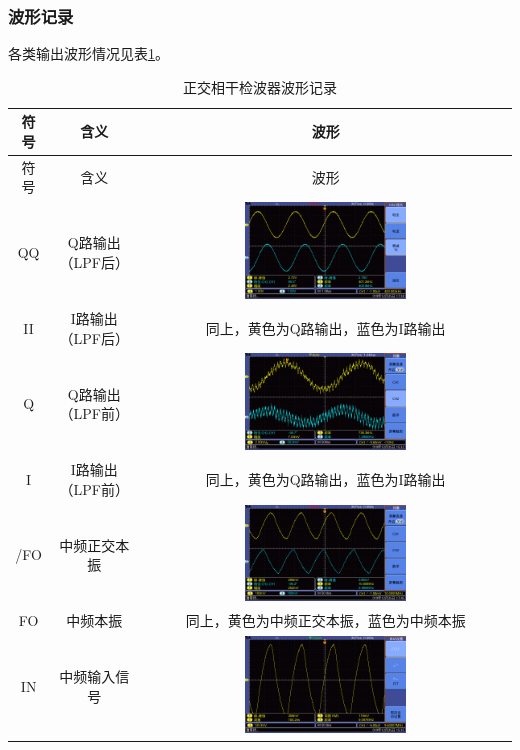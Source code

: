 \documentclass[12pt]{article}
\begin{document}
\subsubsection{波形记录}
各类输出波形情况见表\ref{tab:fdphxwph122}。
\begin{longtable}{|c|c|c|}
    \caption{正交相干检波器波形记录}
    \label{tab:fdphxwph122}\\
    \hline
    符号&含义&波形\\
    \hline
    \endfirsthead

    \hline
    符号&含义&波形\\
    \hline
    \endhead

    \hline
    \endfoot

    \hline
    \endlastfoot

      QQ & Q路输出（LPF后） &\includegraphics[width=0.45\textwidth]{data3/new/F0000TEK} \\
    \hline
    II & I路输出（LPF后） &同上，黄色为Q路输出，蓝色为I路输出  \\
    \hline
    Q & Q路输出（LPF前） &\includegraphics[width=0.45\textwidth]{data3/new2/F0011TEK}  \\
    \hline
    I & I路输出（LPF前） & 同上，黄色为Q路输出，蓝色为I路输出 \\
    \hline
    /FO & 中频正交本振 & \includegraphics[width=0.45\textwidth]{data3/new/F0008TEK} \\
    \hline
    FO & 中频本振 & 同上，黄色为中频正交本振，蓝色为中频本振 \\
    \hline
    IN & 中频输入信号 & \includegraphics[width=0.45\textwidth]{data3/new2/F0013TEK}  \\
\end{longtable}
\end{document}
